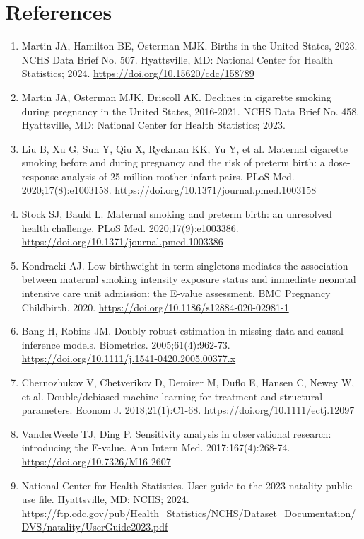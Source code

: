 \section*{References}
{\small\begin{enumerate}[leftmargin=2.4em,labelsep=0.4em,itemsep=2pt,parsep=0pt,label={\arabic*.}]
\item Martin JA, Hamilton BE, Osterman MJK. Births in the United States, 2023. NCHS Data Brief No. 507. Hyattsville, MD: National Center for Health Statistics; 2024. \url{https://doi.org/10.15620/cdc/158789}
\item Martin JA, Osterman MJK, Driscoll AK. Declines in cigarette smoking during pregnancy in the United States, 2016-2021. NCHS Data Brief No. 458. Hyattsville, MD: National Center for Health Statistics; 2023.
\item Liu B, Xu G, Sun Y, Qiu X, Ryckman KK, Yu Y, et al. Maternal cigarette smoking before and during pregnancy and the risk of preterm birth: a dose-response analysis of 25 million mother-infant pairs. PLoS Med. 2020;17(8):e1003158. \url{https://doi.org/10.1371/journal.pmed.1003158}
\item Stock SJ, Bauld L. Maternal smoking and preterm birth: an unresolved health challenge. PLoS Med. 2020;17(9):e1003386. \url{https://doi.org/10.1371/journal.pmed.1003386}
\item Kondracki AJ. Low birthweight in term singletons mediates the association between maternal smoking intensity exposure status and immediate neonatal intensive care unit admission: the E-value assessment. BMC Pregnancy Childbirth. 2020. \url{https://doi.org/10.1186/s12884-020-02981-1}
\item Bang H, Robins JM. Doubly robust estimation in missing data and causal inference models. Biometrics. 2005;61(4):962-73. \url{https://doi.org/10.1111/j.1541-0420.2005.00377.x}
\item Chernozhukov V, Chetverikov D, Demirer M, Duflo E, Hansen C, Newey W, et al. Double/debiased machine learning for treatment and structural parameters. Econom J. 2018;21(1):C1-68. \url{https://doi.org/10.1111/ectj.12097}
\item VanderWeele TJ, Ding P. Sensitivity analysis in observational research: introducing the E-value. Ann Intern Med. 2017;167(4):268-74. \url{https://doi.org/10.7326/M16-2607}
\item National Center for Health Statistics. User guide to the 2023 natality public use file. Hyattsville, MD: NCHS; 2024. \url{https://ftp.cdc.gov/pub/Health_Statistics/NCHS/Dataset_Documentation/DVS/natality/UserGuide2023.pdf}

\end{enumerate}}
